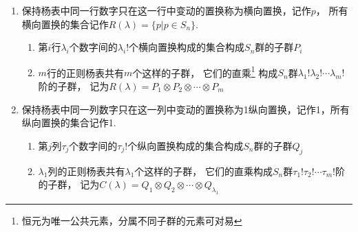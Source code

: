 \begin{newlemma}[横纵置换]
\begin{enumerate}

	\item 
	保持杨表中同一行数字只在这一行中变动的置换称为{\color{seco}横向置换}，记作$p$，
	所有横向置换的集合记作$R(\lambda)=\{p|p\in S_n \}$.
	\begin{enumerate}
	\item 
	第$i$行$\lambda_i$个数字间的$\lambda_i !$个横向置换构成的集合构成$S_n$群的子群$P_i$
	\item 
	$m$行的正则杨表共有$m$个这样的子群，
	它们的直乘\footnote{恒元为唯一公共元素，分属不同子群的元素可对易}
	构成$S_n$群$\lambda_1! \lambda_2! \cdots \lambda_m!$阶的子群，
	记为$R(\lambda)=P_1\otimes P_2\otimes \cdots \otimes P_m$
	\end{enumerate}
	\item
	保持杨表中同一列数字只在这一列中变动的置换称为1纵向置换，记作1，所有纵向置换的集合记作1.
	\begin{enumerate}
	\item 
	第$j$列$\tau_j$个数字间的$\tau_j!$个纵向置换构成的集合构成$S_n$群的子群$Q_j$
	\item 
	$\lambda_1$列的正则杨表共有$\lambda_1$个这样的子群，
	它们的直乘构成$S_n$群$\tau_1! \tau_2! \cdots \tau_m!$阶的子群，
	记为$C(\lambda)=Q_1\otimes Q_2\otimes \cdots \otimes Q_{\lambda_1}$
	\end{enumerate}	
\end{enumerate}
\end{newlemma}


